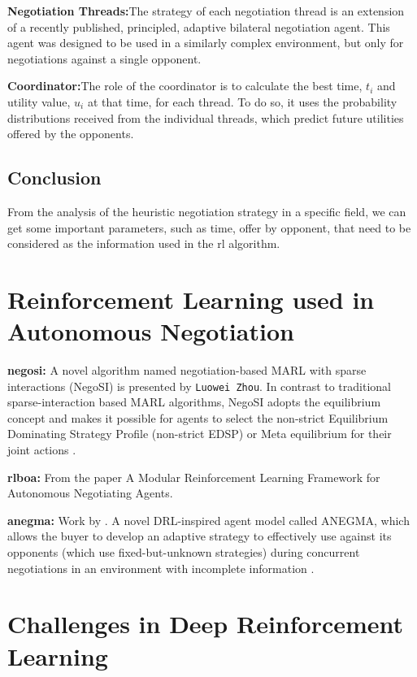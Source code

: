 \textbf{Negotiation Threads:}The strategy of each negotiation thread is an extension of a recently published, principled, adaptive bilateral negotiation agent. This agent was designed to be used in a similarly complex environment, but only for negotiations against a single opponent.

\textbf{Coordinator:}The role of the coordinator is to calculate the best time, $t_i$ and utility value, $u_i$ at that time, for each thread. To do so, it uses the probability distributions received from the individual threads, which predict future utilities offered by the opponents.

\subsection{Conclusion}
From the analysis of the heuristic negotiation strategy in a specific field, we can get some important parameters, such as time, offer by opponent, that need to be considered as the information used in the \gls{rl} algorithm.

\section{Reinforcement Learning used in Autonomous Negotiation}
\textbf{\gls{negosi}:} A novel algorithm named negotiation-based MARL
with sparse interactions (NegoSI) is presented by \texttt{Luowei Zhou}. In contrast to traditional sparse-interaction based MARL algorithms, NegoSI adopts the equilibrium concept and makes it possible for agents to select the non-strict Equilibrium Dominating Strategy Profile (non-strict EDSP) or Meta equilibrium for their joint actions \parencite{L2017NegoSI}.


\textbf{\gls{rlboa}:} From the paper \parencite{Bakker2019RLBOAAM} A Modular Reinforcement Learning Framework for Autonomous Negotiating Agents.

\textbf{\gls{anegma}:} Work by \parencite{bagga2020deep}. A novel DRL-inspired agent model called ANEGMA, which allows the buyer to develop an adaptive strategy to effectively use against its opponents (which use fixed-but-unknown strategies) during concurrent negotiations in an environment with incomplete information . 


\section{Challenges in Deep Reinforcement Learning}

